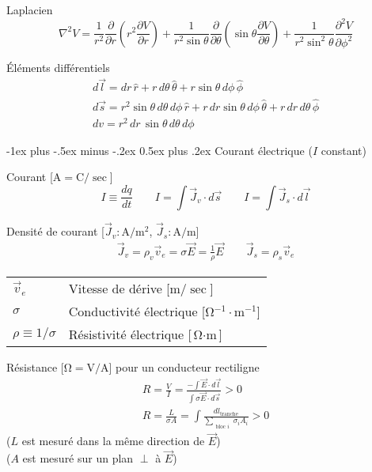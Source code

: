 \documentclass[10pt,landscape]{article}
\makeatletter
\renewcommand{\section}{\@startsection{section}{1}{0mm}%
                                {-1ex plus -.5ex minus -.2ex}%
                                {0.5ex plus .2ex}%
                                {\normalfont\large\bfseries}}
\newcommand{\extraline}{\vspace{1em}}
\newcommand{\tableindent}{\hspace{1.5em}}
\newcommand{\uvec}[1]{\ensuremath{{\hat{#1}}}}
\makeatother
\begin{document}
\begin{multicols}{3}
Laplacien
\[ \nabla^2 V = \frac{1}{r^2} \frac{\partial}{\partial r}\left( r^2 \frac{\partial V}{\partial r} \right)
+ \frac{1}{r^2\sin\theta}\frac{\partial}{\partial \theta} \left( \sin\theta \frac{\partial V}{\partial\theta} \right)
+ \frac{1}{r^2\sin^2\theta}\frac{\partial^2 V}{\partial \phi^2} \]

Éléments différentiels
\begin{gather*}
d\vec{l} = dr\,\uvec{r} + r\,d\theta\,\uvec{\theta} + r\sin\theta\,d\phi\,\uvec{\phi} \\
d\vec{s} = r^2\sin\theta\,d\theta\,d\phi\,\uvec{r} 
+ r\,dr\sin\theta\,d\phi\,\uvec{\theta}
+ r\,dr\,d\theta\,\uvec{\phi} \\
dv = r^2\,dr\,\sin\theta\,d\theta\,d\phi
\end{gather*}


\hrulefill
\section{Courant électrique ($I$ constant)}

Courant [$\si{\ampere} = \si{\coulomb}/\si{\sec}$]
\[ I \equiv \frac{dq}{dt}
\qquad
I =\int \vec{J}_v \cdot d\vec{s} \qquad
I = \int \vec{J}_s \cdot d\vec{l}
\]

Densité de courant [$\vec{J}_v: \si{\ampere/\metre^2}$, $\vec{J}_s: \si{\ampere/\metre}$]
\begin{gather*}
\vec{J}_v = \rho_v \vec{v}_e = \sigma\vec{E} = \frac{1}{\rho} \vec{E} 
\qquad
\vec{J}_s  = \rho_s \vec{v}_e
\end{gather*}
%
\begin{tabular}{@{\tableindent}ll@{}}
	$\vec{v}_e$ & Vitesse de dérive [$\si{\metre/\sec}$] \\
	$\sigma$ & Conductivité électrique [$\si{\ohm^{-1}\cdot\meter^{-1}}$] \\
	$\rho \equiv 1/\sigma$ & Résistivité électrique  [$\si{\ohm\cdot\meter}$] \\
\end{tabular}

\extraline
Résistance [$\si{\ohm} = \si{\volt/\ampere}$] pour un conducteur rectiligne
\begin{gather*}
R = \frac{V}{I}
= \frac{-\int \vec{E}\cdot{d\vec{l}}}{\int \sigma \vec{E}\cdot{d\vec{s}}} > 0  \\
R = \frac{L}{\sigma A} 
= \int \frac{dl_\text{tranche}}
{\sum\limits_{{{\substack{\text{bloc $i$}}}}} \sigma_i A_i} > 0
\end{gather*}
\tableindent ($L$ est mesuré dans la même direction de $\vec{E}$) \\
\tableindent ($A$ est mesuré sur un plan $\perp$ à $\vec{E}$) \\


\end{multicols}
\end{document}
